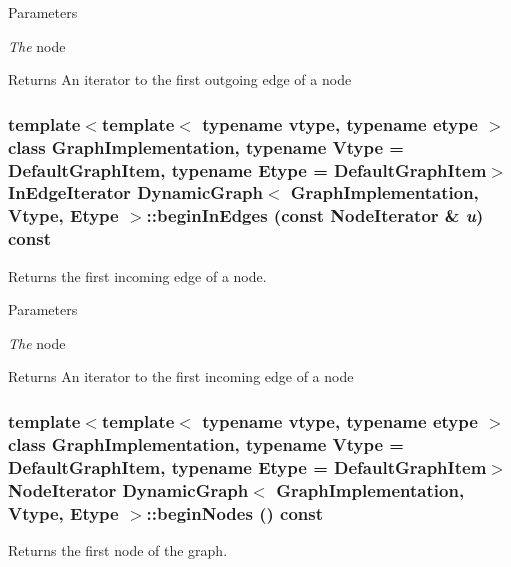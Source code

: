 \begin{DoxyParams}{Parameters}
\item[{\em The}]node\end{DoxyParams}
\begin{DoxyReturn}{Returns}
An iterator to the first outgoing edge of a node 
\end{DoxyReturn}
\hypertarget{class_dynamic_graph_a56f09cd0f91aa2b35e28bbb3cd0568a4}{
\subsubsection[{beginInEdges}]{\setlength{\rightskip}{0pt plus 5cm}template$<$template$<$ typename vtype, typename etype $>$ class GraphImplementation, typename Vtype  = DefaultGraphItem, typename Etype  = DefaultGraphItem$>$ InEdgeIterator {\bf DynamicGraph}$<$ GraphImplementation, Vtype, Etype $>$::beginInEdges (const NodeIterator \& {\em u}) const}}
\label{class_dynamic_graph_a56f09cd0f91aa2b35e28bbb3cd0568a4}


Returns the first incoming edge of a node. 


\begin{DoxyParams}{Parameters}
\item[{\em The}]node\end{DoxyParams}
\begin{DoxyReturn}{Returns}
An iterator to the first incoming edge of a node 
\end{DoxyReturn}
\hypertarget{class_dynamic_graph_a4ca30c1f555cc535d47243562ffbc7ae}{
\subsubsection[{beginNodes}]{\setlength{\rightskip}{0pt plus 5cm}template$<$template$<$ typename vtype, typename etype $>$ class GraphImplementation, typename Vtype  = DefaultGraphItem, typename Etype  = DefaultGraphItem$>$ NodeIterator {\bf DynamicGraph}$<$ GraphImplementation, Vtype, Etype $>$::beginNodes () const}}
\label{class_dynamic_graph_a4ca30c1f555cc535d47243562ffbc7ae}


Returns the first node of the graph. 

